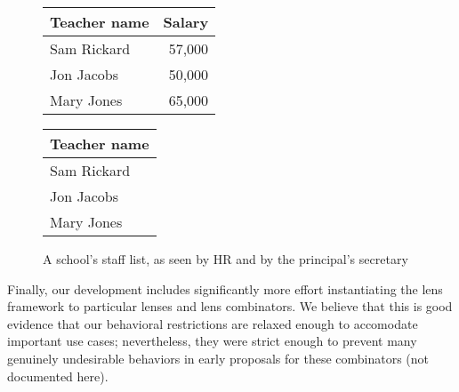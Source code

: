 \begin{figure}
    \begin{minipage}{0.5\linewidth}
        \centering
        \begin{tabular}{lr}
            Teacher name & Salary \\
            \hline
            Sam Rickard & 57,000 \\
            Jon Jacobs & 50,000 \\
            Mary Jones & 65,000 \\
        \end{tabular}
        \label{fig:school-salaries-delins-hr}
    \end{minipage}%
    \begin{minipage}{0.5\linewidth}
        \centering
        \begin{tabular}{l}
            Teacher name \\
            \hline
            Sam Rickard \\
            Jon Jacobs \\
            Mary Jones \\
        \end{tabular}
        \label{fig:school-salaries-delins-sec-pre}
    \end{minipage}%
    \caption{A school's staff list, as seen by HR and by the principal's secretary}
    \label{fig:school-salaries-delins}
\end{figure}

Finally, our development includes significantly more effort instantiating
the lens framework to particular lenses and lens combinators. We believe
that this is good evidence that our behavioral restrictions are relaxed
enough to accomodate important use cases; nevertheless, they were strict
enough to prevent many genuinely undesirable behaviors in early proposals
for these combinators (not documented here).


